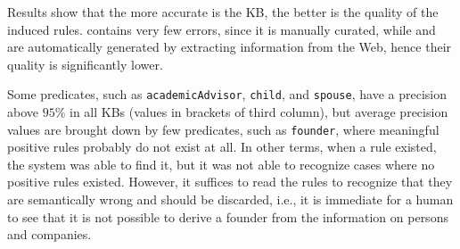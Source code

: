 Results show that the more accurate is the KB, the better is the quality of the induced rules. \wikidata contains very few errors, since it is manually curated, while
 \dbpedia and \yago are automatically generated by extracting information from the Web, hence their quality is significantly lower. 

Some predicates, such as \texttt{academicAdvisor}, \texttt{child}, and \texttt{spouse}, have a precision above $95\%$ in all KBs (values in brackets of third column), but average precision values are brought down by few predicates, such as \texttt{founder}, where meaningful positive rules probably do not exist at all. In other terms, when a rule existed, the system was able to find it, but it was not able to recognize cases where no positive rules existed. However, it suffices to read the rules to recognize that they are semantically wrong and should be discarded, i.e., it is immediate for a human to see that it is not possible to derive a founder from the information on persons and companies.  %

